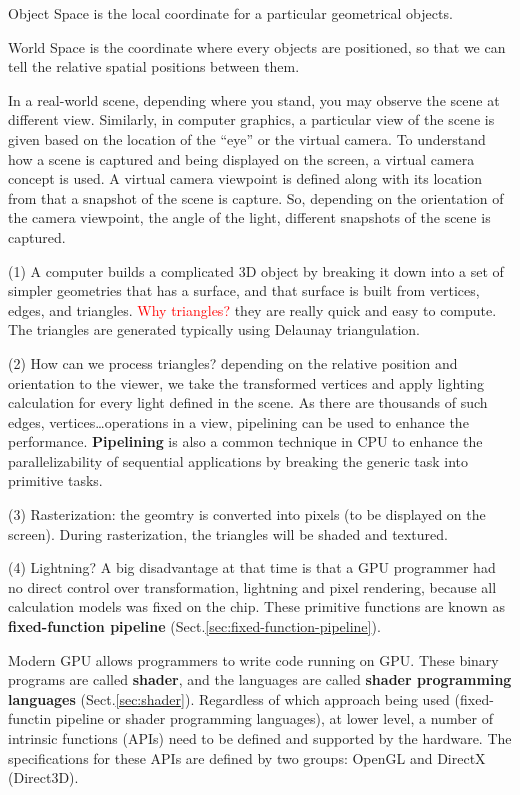 Object Space is the local coordinate  for a particular geometrical objects.

World Space is the coordinate where every objects are positioned, so that we can
tell the relative spatial positions between them.

In a real-world scene, depending where you stand, you may observe the scene at
different view. Similarly, in computer graphics, a particular view of the scene
is given based on the location of the ``eye'' or the virtual camera. To
understand how a scene is captured and being displayed on the screen, a virtual
camera concept is used. A virtual camera viewpoint is defined along with its
location from that a snapshot of the scene is capture. So, depending on the
orientation of the camera viewpoint, the angle of the light, different snapshots
of the scene is captured.


(1) A computer builds a complicated 3D object by breaking it down into a
set of simpler geometries that has a surface, and that surface is built from
vertices, edges, and triangles. \textcolor{red}{Why triangles?} they are really
quick and easy to compute.
The triangles are generated typically using Delaunay triangulation. 

(2) How can we process triangles? depending on the relative position and
orientation to the viewer, we take the transformed vertices and apply lighting
calculation for every light defined in the scene. As there are thousands of such
edges, vertices\ldots operations in a view, pipelining can be used to enhance
the performance. {\bf Pipelining} is also a common technique in CPU to enhance
the parallelizability of sequential applications by breaking the generic  task
into primitive tasks. 

(3) Rasterization: the geomtry is converted into pixels (to be displayed on
the screen). During rasterization, the triangles will be shaded and textured.

(4) Lightning? A big disadvantage at that time is that a GPU programmer had no
direct control over transformation, lightning and pixel rendering, because all
calculation models was fixed on the chip. These primitive functions are known as
{\bf fixed-function pipeline} (Sect.\ref{sec:fixed-function-pipeline}).

Modern GPU allows programmers to write code running on GPU. These binary
programs are called {\bf shader}, and the languages are called {\bf shader
programming languages} (Sect.\ref{sec:shader}). Regardless of which approach
being used (fixed-functin pipeline or shader programming languages), at lower
level, a number of intrinsic functions (APIs) need to be defined and supported
by the hardware. The specifications for these APIs are defined by two groups:
OpenGL and DirectX (Direct3D).

